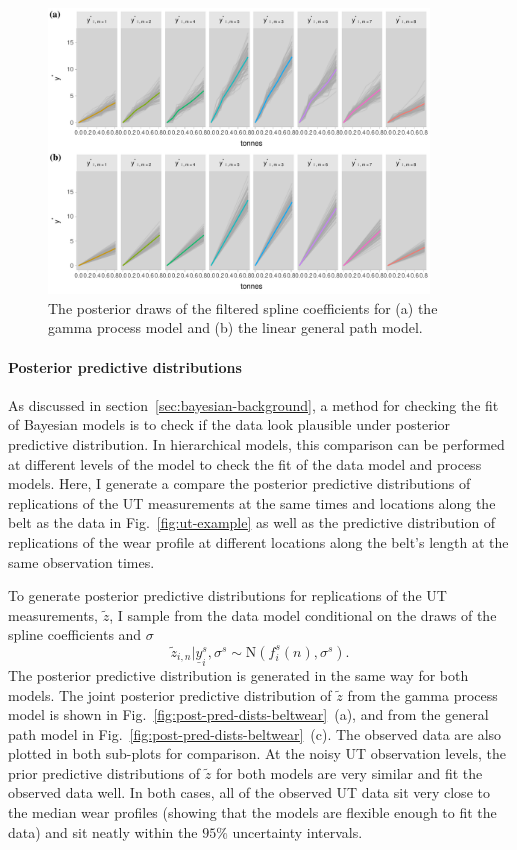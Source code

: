 \begin{figure}
  \centering
  \includegraphics[width=0.9\textwidth]{figures/ch-6/post_y_belt_wear.pdf}
  \caption{The posterior draws of the filtered spline coefficients for (a) the gamma process model and (b) the linear general path model.}
  \label{fig:y-post-beltwear}
\end{figure}

\paragraph{Posterior predictive distributions}

As discussed in section~\ref{sec:bayesian-background}, a method for checking the fit of Bayesian models is to check if the data look plausible under posterior predictive distribution. In hierarchical models, this comparison can be performed at different levels of the model to check the fit of the data model and process models. Here, I generate a compare the posterior predictive distributions of replications of the UT measurements at the same times and locations along the belt as the data in Fig.~\ref{fig:ut-example} as well as the predictive distribution of replications of the wear profile at different locations along the belt's length at the same observation times.

To generate posterior predictive distributions for replications of the UT measurements, $\tilde{z}$, I sample from the data model conditional on the draws of the spline coefficients and $\sigma$
\begin{equation}
  \tilde{z}_{i, n}|\underline{y}_{i}^s, \sigma^s \sim \mbox{N}\left(f^s_i(n), \sigma^s\right).
\end{equation}
The posterior predictive distribution is generated in the same way for both models. The joint posterior predictive distribution of $\tilde{z}$ from the gamma process model is shown in Fig.~\ref{fig:post-pred-dists-beltwear}~(a), and from the general path model in Fig.~\ref{fig:post-pred-dists-beltwear}~(c). The observed data are also plotted in both sub-plots for comparison. At the noisy UT observation levels, the prior predictive distributions of $\tilde{z}$ for both models are very similar and fit the observed data well. In both cases, all of the observed UT data sit very close to the median wear profiles (showing that the models are flexible enough to fit the data) and sit neatly within the $95\%$ uncertainty intervals. 

